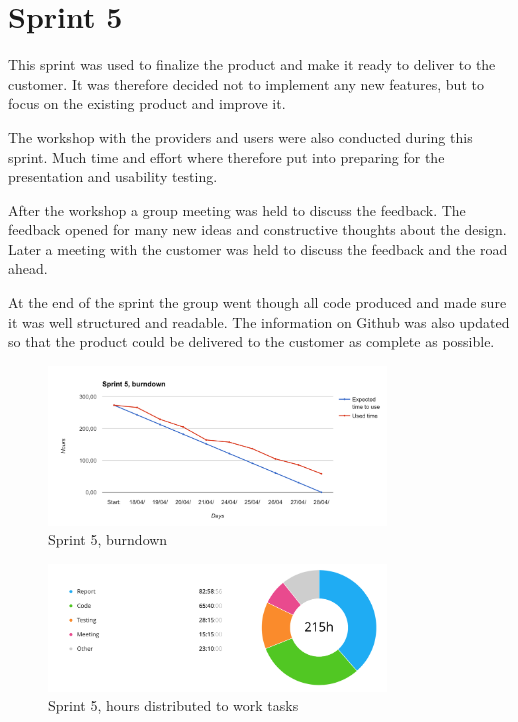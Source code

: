 \section{Sprint 5}
\label{sprint5}
This sprint was used to finalize the product and make it ready to deliver to the customer. It was therefore decided not to implement any new features, but to focus on the existing product and improve it. 

The workshop with the providers and users were also conducted during this sprint. Much time and effort where therefore put into preparing for the presentation and usability testing. 

After the workshop a group meeting was held to discuss the feedback. The feedback opened for many new ideas and constructive thoughts about the design. Later a meeting with the customer was held to discuss the feedback and the road ahead. 

At the end of the sprint the group went though all code produced and made sure it was well structured and readable. The information on Github was also updated so that the product could be delivered to the customer as complete as possible.


\begin{figure}[ht]
\centering
    \includegraphics[width=0.8\textwidth]{fig/sprint5}
\caption{Sprint 5, burndown}
\end{figure}

\begin{figure}[ht]
\centering
    \includegraphics[width=0.8\textwidth]{fig/sprint5-diagram}
\caption{Sprint 5, hours distributed to work tasks}
\end{figure}

\cleardoublepage
